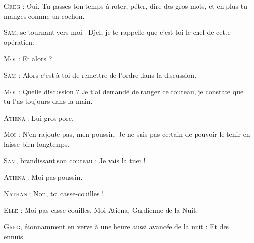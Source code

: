 \begin{dialogue}
\textsc{Greg} : Oui. Tu passes ton temps à roter, péter, dire des gros mots, et en plus tu manges comme un cochon.

\textsc{Sam}, se tournant vers moi : Djef, je te rappelle que c’est toi le chef de cette opération.

\textsc{Moi} : Et alors ?

\textsc{Sam} : Alors c’est à toi de remettre de l’ordre dans la discussion.

\textsc{Moi} : Quelle discussion ? Je t’ai demandé de ranger ce couteau, je constate que tu l’as toujours dans la main.

\textsc{Atiena} : Lui gros porc.

\textsc{Moi} : N’en rajoute pas, mon poussin. Je ne suis pas certain de pouvoir le tenir en laisse bien longtemps.

\textsc{Sam}, brandissant son couteau : Je vais la tuer !

\textsc{Atiena} : Moi pas poussin.

\textsc{Nathan} : Non, toi casse-couilles !

\textsc{Elle} : Moi pas casse-couilles. Moi Atiena, Gardienne de la Nuit.

\textsc{Greg}, étonnamment en verve à une heure aussi avancée de la nuit : Et des ennuis.

\end{dialogue}

